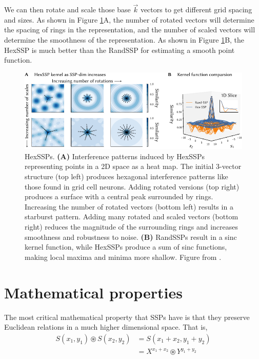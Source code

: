 \documentclass[10pt,letterpaper,oneside]{article}
\begin{document}
We can then rotate and scale those base $\vec{k}$ vectors to get different grid spacing and sizes. As shown in Figure \ref{fig:SSP_kernels.pdf}A, the number of rotated vectors will determine the spacing of rings in the representation, and the number of scaled vectors will determine the smoothness of the representation. As shown in Figure \ref{fig:SSP_kernels.pdf}B, the HexSSP is much better than the RandSSP for estimating a smooth point function.

\begin{figure}
  \centering
  \includegraphics[width=\linewidth]{media/SSP_kernels.pdf}
  \caption{HexSSPs. \textbf{(A)} Interference patterns induced by HexSSPs representing points in a 2D space as a heat map. The initial 3-vector structure (top left) produces hexagonal interference patterns like those found in grid cell neurons.  Adding rotated versions (top right) produces a surface with a central peak surrounded by rings.  Increasing the number of rotated vectors (bottom left) results in a starburst pattern. Adding many rotated and scaled vectors (bottom right) reduces the magnitude of the surrounding rings and increases smoothness and robustness to noise. \textbf{(B)} RandSSPs result in a sinc kernel function, while HexSSPs produce a sum of sinc functions, making local maxima and minima more shallow. Figure from \cite{furlong2024bo}.}
  \label{fig:SSP_kernels.pdf}
\end{figure}


\section{Mathematical properties}

The most critical mathematical property that SSPs have is that they preserve Euclidean relations in a much higher dimensional space. That is, 
\begin{align}
   S(x_1,y_1) \circledast S(x_2,y_2) 
   &= S(x_1 + x_2,y_1 + y_2) \\
   &= X^{x_1 + x_2} \circledast Y^{y_1 + y_2}
\end{align}
\end{document}
